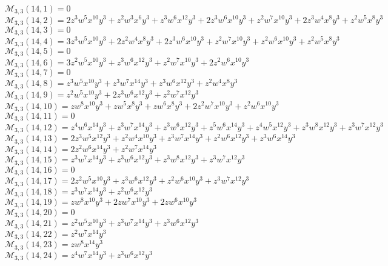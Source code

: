 $\mathcal{M}_{3,3}(14,1)=0$\\
$\mathcal{M}_{3,3}(14,2)=2z^3w^5x^{10}y^3+z^2w^3x^6y^3+z^3w^6x^{12}y^3+2z^3w^6x^{10}y^3+z^2w^7x^{10}y^3+2z^3w^4x^8y^3+z^2w^5x^8y^3$\\
$\mathcal{M}_{3,3}(14,3)=0$\\
$\mathcal{M}_{3,3}(14,4)=3z^3w^5x^{10}y^3+2z^2w^4x^8y^3+2z^3w^6x^{10}y^3+z^2w^7x^{10}y^3+z^2w^6x^{10}y^3+z^2w^5x^8y^3$\\
$\mathcal{M}_{3,3}(14,5)=0$\\
$\mathcal{M}_{3,3}(14,6)=3z^2w^5x^{10}y^3+z^3w^6x^{12}y^3+z^2w^7x^{10}y^3+2z^2w^6x^{10}y^3$\\
$\mathcal{M}_{3,3}(14,7)=0$\\
$\mathcal{M}_{3,3}(14,8)=z^3w^5x^{10}y^3+z^3w^7x^{14}y^3+z^3w^6x^{12}y^3+z^2w^4x^8y^3$\\
$\mathcal{M}_{3,3}(14,9)=z^2w^5x^{10}y^3+2z^3w^6x^{12}y^3+z^2w^7x^{12}y^3$\\
$\mathcal{M}_{3,3}(14,10)=zw^8x^{10}y^3+zw^5x^8y^3+zw^6x^8y^3+2z^2w^7x^{10}y^3+z^2w^6x^{10}y^3$\\
$\mathcal{M}_{3,3}(14,11)=0$\\
$\mathcal{M}_{3,3}(14,12)=z^4w^6x^{14}y^3+z^3w^7x^{14}y^3+z^3w^6x^{12}y^3+z^5w^6x^{14}y^3+z^4w^5x^{12}y^3+z^3w^8x^{12}y^3+z^3w^7x^{12}y^3$\\
$\mathcal{M}_{3,3}(14,13)=2z^3w^5x^{12}y^3+z^2w^4x^{10}y^3+z^3w^7x^{14}y^3+z^2w^6x^{12}y^3+z^3w^6x^{14}y^3$\\
$\mathcal{M}_{3,3}(14,14)=2z^2w^6x^{14}y^3+z^2w^7x^{14}y^3$\\
$\mathcal{M}_{3,3}(14,15)=z^3w^7x^{14}y^3+z^3w^6x^{12}y^3+z^3w^8x^{12}y^3+z^3w^7x^{12}y^3$\\
$\mathcal{M}_{3,3}(14,16)=0$\\
$\mathcal{M}_{3,3}(14,17)=2z^2w^5x^{10}y^3+z^3w^6x^{12}y^3+z^2w^6x^{10}y^3+z^3w^7x^{12}y^3$\\
$\mathcal{M}_{3,3}(14,18)=z^3w^7x^{14}y^3+z^2w^6x^{12}y^3$\\
$\mathcal{M}_{3,3}(14,19)=zw^8x^{10}y^3+2zw^7x^{10}y^3+2zw^6x^{10}y^3$\\
$\mathcal{M}_{3,3}(14,20)=0$\\
$\mathcal{M}_{3,3}(14,21)=z^2w^5x^{10}y^3+z^3w^7x^{14}y^3+z^3w^6x^{12}y^3$\\
$\mathcal{M}_{3,3}(14,22)=z^2w^7x^{14}y^3$\\
$\mathcal{M}_{3,3}(14,23)=zw^8x^{14}y^3$\\
$\mathcal{M}_{3,3}(14,24)=z^4w^7x^{14}y^3+z^3w^6x^{12}y^3$\\
